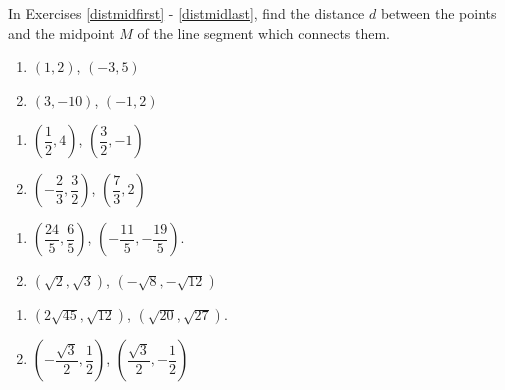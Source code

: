 In Exercises \ref{distmidfirst} - \ref{distmidlast}, find the distance $d$ between the points and the midpoint $M$ of the line segment which connects them.


\begin{multicols}{2}
\begin{enumerate}
\setcounter{enumi}{\value{HW}}

\item $(1,2)$, $(-3,5)$ \label{distmidfirst}
\item $(3, -10)$, $(-1, 2)$ 

\setcounter{HW}{\value{enumi}}
\end{enumerate}
\end{multicols}

\begin{multicols}{2}
\begin{enumerate}
\setcounter{enumi}{\value{HW}}

\item $\left( \dfrac{1}{2}, 4\right)$, $\left(\dfrac{3}{2}, -1\right)$ 
\item $\left(- \dfrac{2}{3}, \dfrac{3}{2} \right)$, $\left(\dfrac{7}{3}, 2\right)$ 

\setcounter{HW}{\value{enumi}}
\end{enumerate}
\end{multicols}


\begin{multicols}{2}
\begin{enumerate}
\setcounter{enumi}{\value{HW}}

\item  $\left( \dfrac{24}{5}, \dfrac{6}{5} \right)$, $\left( -\dfrac{11}{5}, -\dfrac{19}{5} \right)$.
\item $\left(\sqrt{2}, \sqrt{3}\right)$, $\left(-\sqrt{8}, -\sqrt{12}\right)$ 

\setcounter{HW}{\value{enumi}}
\end{enumerate}
\end{multicols}

\begin{multicols}{2}
\begin{enumerate}
\setcounter{enumi}{\value{HW}}

\item  $\left(2 \sqrt{45}, \sqrt{12} \right)$, $\left(\sqrt{20}, \sqrt{27} \right)$. 
\item $\left(-\dfrac{\sqrt{3}}{2}, \dfrac{1}{2} \right)$, $\left(\dfrac{\sqrt{3}}{2}, -\dfrac{1}{2} \right)$ \label{distmidlast}

\setcounter{HW}{\value{enumi}}
\end{enumerate}
\end{multicols}

